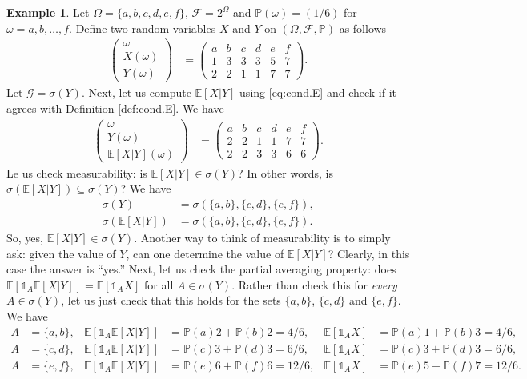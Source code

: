 \documentclass[12pt]{book}
\numberwithin{equation}{chapter}
\theoremstyle{plain}
\numberwithin{theorem}{section}
\theoremstyle{definition}
\newtheorem{example}[theorem]{\underline{Example}}
\numberwithin{exercise}{chapter}
\newcommand{\<}{\langle}
\renewcommand{\>}{\rangle}
\renewcommand{\(}{\left(}
\renewcommand{\)}{\right)}
\renewcommand{\[}{\left[}
\renewcommand{\]}{\right]}
\newcommand\Eb{\mathds{E}}
\newcommand\Ib{\mathds{1}} 	%
\newcommand\Pb{\mathds{P}}
\newcommand\Fc{\mathscr{F}}
\newcommand\Gc{\mathscr{G}}
\newcommand\om{\omega}
\newcommand\Om{\Omega}
\newcommand\sig{\sigma}
\begin{document}
\begin{example}
Let $\Om = \{ a, b, c, d, e, f \}$, $\Fc = 2^\Om$ and $\Pb( \om ) = (1/6)$ for $\om=a,b,\ldots,f$.  Define two random variables $X$ and $Y$ on $(\Om,\Fc,\Pb)$ as follows
\begin{align}
\( \begin{array}{c} \om \\ X(\om) \\ Y(\om) 
\end{array} \)
	&=	\( \begin{array}{cccccc} 
			a & b & c & d & e & f \\ 
			1 & 3 & 3 & 3 & 5 & 7 \\ 
			2 & 2 & 1 & 1 & 7 & 7 
\end{array} \) .
\end{align}
Let $\Gc = \sig(Y)$.  Next, let us compute $\Eb[X|Y]$ using \eqref{eq:cond.E} and check if it agrees with Definition \ref{def:cond.E}.  We have
\begin{align}
\( \begin{array}{c} 
\om \\ Y(\om) \\ \Eb[X|Y](\om) 
\end{array} \)
	&=	\( \begin{array}{cccccc} 
			a & b & c & d & e & f \\ 
			2 & 2 & 1 & 1 & 7 & 7 \\
			2 & 2 & 3 & 3 & 6 & 6 
			\end{array} \) .
\end{align}
Le us check measurability: is $\Eb[X|Y] \in \sig(Y)$?  In other words, is $\sig(\Eb[X|Y]) \subseteq \sig(Y)$?  We have
\begin{align}
\sig(Y)
	&=	\sig( \{a,b\}, \{c,d\}, \{e,f\} ) , \\
\sig(\Eb[X|Y])
	&=	\sig( \{a,b\}, \{c,d\}, \{e,f\} ) .
\end{align}
So, yes, $\Eb[X|Y] \in \sig(Y)$.  Another way to think of measurability is to simply ask: given the value of $Y$, can one determine the value of $\Eb[X|Y]$?  Clearly, in this case the answer is ``yes.''
Next, let us check the partial averaging property: does $\Eb[ \Ib_A \Eb[X|Y] ] = \Eb[ \Ib_A X ]$ for all $A \in \sig(Y)$.  Rather than check this for \emph{every} $A \in \sig(Y)$, let us just check that this holds for the sets $\{a,b\}$, $\{c,d\}$ and $\{e,f\}$.  We have
\begin{align}
A
	&=	\{ a, b\}, &
\Eb[ \Ib_A \Eb[ X | Y ] ]
	&=	\Pb(a) 2 + \Pb(b) 2 = 4/6, &
\Eb[ \Ib_A X ]
	&=	\Pb(a) 1 + \Pb(b) 3 = 4/6, \\
A
	&=	\{ c, d\}, &
\Eb[ \Ib_A \Eb[ X | Y ] ]
	&=	\Pb(c) 3 + \Pb(d) 3 = 6/6, &
\Eb[ \Ib_A X ]
	&=	\Pb(c) 3 + \Pb(d) 3 = 6/6, \\
A
	&=	\{ e, f\}, &
\Eb[ \Ib_A \Eb[ X | Y ] ]
	&=	\Pb(e) 6 + \Pb(f) 6 = 12/6, &
\Eb[ \Ib_A X ]
	&=	\Pb(e) 5 + \Pb(f) 7 = 12/6 .
\end{align}
\end{example}
\end{document}
